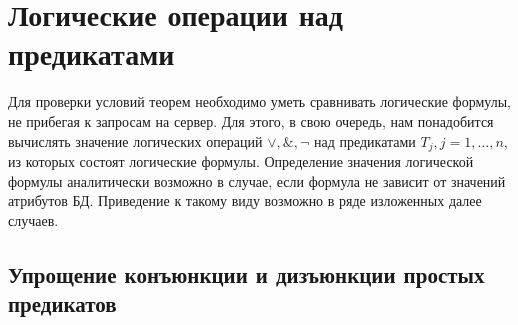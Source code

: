 \documentclass[10pt,a4paper]{article}
\begin{document}
\section{Логические операции над предикатами}
Для проверки условий теорем необходимо уметь сравнивать логические формулы, не прибегая к запросам
на сервер. Для этого, в свою очередь, нам понадобится вычислять значение логических операций $\vee,
\&, \neg$ над предикатами $T_j, j=1, \dots, n$, из которых состоят логические формулы. Определение значения логической формулы аналитически возможно в случае, если формула не зависит от значений атрибутов БД. Приведение к такому виду возможно в ряде изложенных далее случаев.

\subsection{Упрощение конъюнкции и дизъюнкции простых предикатов}
\end{document}
